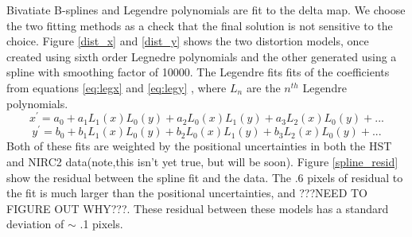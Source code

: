 Bivatiate B-splines and Legendre polynomials are fit to the delta map.  We choose the two fitting methods as a check that the final solution is not sensitive to the choice.  Figure \ref{dist_x} and \ref{dist_y} shows the two distortion models, once created using sixth order Legnedre polynomials and the other generated using a spline with smoothing factor of 10000.  The Legendre fits fits of the coefficients from equations \ref{eq:legx} and \ref{eq:legy} , where $L_{n}$ are the $n^{th}$ Legendre polynomials.  
\begin{equation}
x^{'} = a_{0} + a_{1}L_{1}(x)L_{0}(y) +  a_{2}L_{0}(x)L_{1}(y) + a_{3}L_{2}(x)L_{0}(y)+...
\label{eq:legx}
\end{equation}
\begin{equation}
y^{'} = b_{0} + b_{1}L_{1}(x)L_{0}(y) +  b_{2}L_{0}(x)L_{1}(y) + b_{3}L_{2}(x)L_{0}(y)+...
\label{eq:legy}
\end{equation}
Both of these fits are weighted by the positional uncertainties in both the HST and NIRC2 data(note,this isn't yet true, but will be soon). Figure \ref{spline_resid} show the residual between the spline fit and the data.  The .6 pixels of residual to the fit is much larger than the positional uncertainties, and ???NEED TO FIGURE OUT WHY???.  These residual between these models has a standard deviation of $\sim$ .1 pixels.
